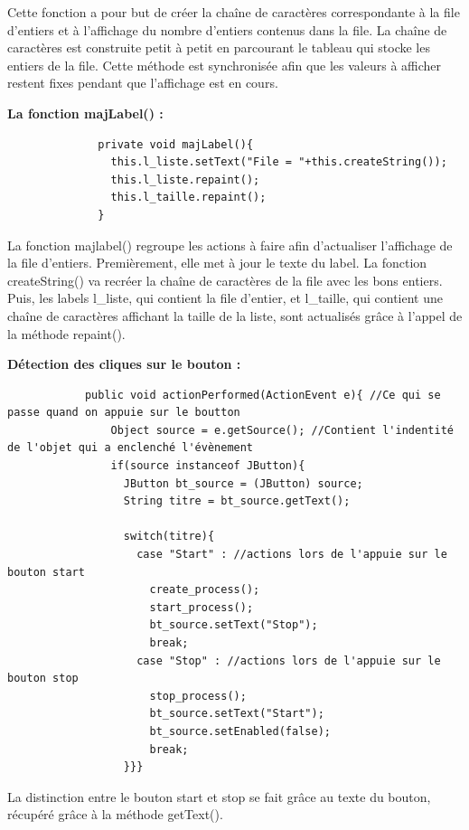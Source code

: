 \documentclass{article}
\begin{document}
        Cette fonction a pour but de créer la chaîne de caractères correspondante à la file d'entiers et à l'affichage du nombre d'entiers contenus dans la file. La chaîne de caractères est construite petit à petit en parcourant le tableau qui stocke les entiers de la file. Cette méthode est synchronisée afin que les valeurs à afficher restent fixes pendant que l'affichage est en cours.
        \bigskip

    \textbf{La fonction majLabel() : }
        \begin{verbatim}
              private void majLabel(){
                this.l_liste.setText("File = "+this.createString());
                this.l_liste.repaint();
                this.l_taille.repaint();
              }
        \end{verbatim}

        La fonction majlabel() regroupe les actions à faire afin d'actualiser l'affichage de la file d'entiers. Premièrement, elle met à jour le texte du label. La fonction createString() va recréer la chaîne de caractères de la file avec les bons entiers.
        Puis, les labels l\_liste, qui contient la file d'entier, et l\_taille, qui contient une chaîne de caractères affichant la taille de la liste, sont actualisés grâce à l'appel de la méthode repaint().
        \bigskip

    \textbf{Détection des cliques sur le bouton : }
        \begin{verbatim}
            public void actionPerformed(ActionEvent e){ //Ce qui se passe quand on appuie sur le boutton
                Object source = e.getSource(); //Contient l'indentité de l'objet qui a enclenché l'évènement
                if(source instanceof JButton){
                  JButton bt_source = (JButton) source;
                  String titre = bt_source.getText();

                  switch(titre){
                    case "Start" : //actions lors de l'appuie sur le bouton start
                      create_process();
                      start_process();
                      bt_source.setText("Stop");
                      break;
                    case "Stop" : //actions lors de l'appuie sur le bouton stop
                      stop_process();
                      bt_source.setText("Start");
                      bt_source.setEnabled(false);
                      break;
                  }}}
        \end{verbatim}

        La distinction entre le bouton start et stop se fait grâce au texte du bouton, récupéré grâce à la méthode getText().
        \bigskip
\end{document}
